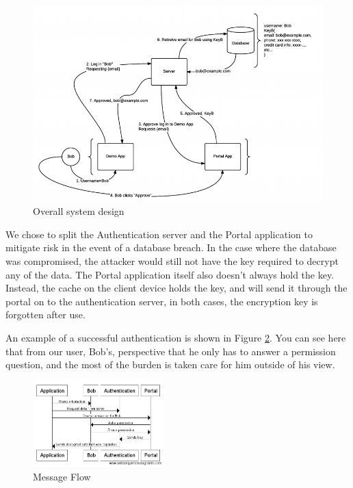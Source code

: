 \documentclass[letterpaper,twocolumn,10pt]{article}
\begin{document}
\begin{figure}[ht]
\centering
\includegraphics[width=\textwidth]{Design}
\caption{Overall system design}
\label{design}
\end{figure}

We chose to split the Authentication server and the Portal application to mitigate risk in the event of a database breach. In the case where the database was compromised, the attacker would still not have the key required to decrypt any of the data. The Portal application itself also doesn't always hold the key. Instead, the cache on the client device holds the key, and will send it through the portal on to the authentication server, in both cases, the encryption key is forgotten after use.


An example of a successful authentication is shown in Figure \ref{messageflow}. You can see here that from our user, Bob's, perspective that he only has to answer a permission question, and the most of the burden is taken care for him outside of his view.

\begin{figure}[ht]
\includegraphics[width=0.45\textwidth]{messageDiagram}
\caption{Message Flow}
\label{messageflow}
\end{figure}
\end{document}
